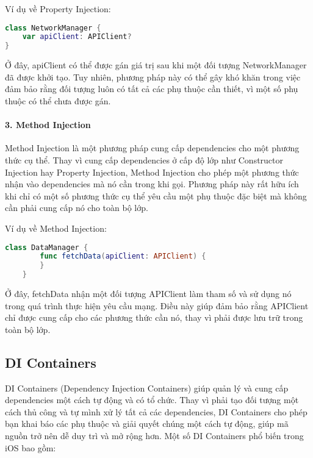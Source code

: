 Ví dụ về Property Injection:
\begin{lstlisting}[language=Swift]
  class NetworkManager {
    var apiClient: APIClient?
}
  \end{lstlisting}
  Ở đây, apiClient có thể được gán giá trị sau khi một đối tượng NetworkManager đã được khởi tạo. Tuy nhiên, phương pháp này có thể gây khó khăn trong việc đảm bảo rằng đối tượng luôn có tất cả các phụ thuộc cần thiết, vì một số phụ thuộc có thể chưa được gán.

\paragraph*{3. Method Injection}
  Method Injection là một phương pháp cung cấp dependencies cho một phương thức cụ thể. Thay vì cung cấp dependencies ở cấp độ lớp như Constructor Injection hay Property Injection, Method Injection cho phép một phương thức nhận vào dependencies mà nó cần trong khi gọi. Phương pháp này rất hữu ích khi chỉ có một số phương thức cụ thể yêu cầu một phụ thuộc đặc biệt mà không cần phải cung cấp nó cho toàn bộ lớp.

  Ví dụ về Method Injection:
  \begin{lstlisting}[language=Swift]
    class DataManager {
        func fetchData(apiClient: APIClient) {
        }
    }
    \end{lstlisting}
    Ở đây, fetchData nhận một đối tượng APIClient làm tham số và sử dụng nó trong quá trình thực hiện yêu cầu mạng. Điều này giúp đảm bảo rằng APIClient chỉ được cung cấp cho các phương thức cần nó, thay vì phải được lưu trữ trong toàn bộ lớp.
\subsection{DI Containers}
    DI Containers (Dependency Injection Containers) giúp quản lý và cung cấp dependencies một cách tự động và có tổ chức. Thay vì phải tạo đối tượng một cách thủ công và tự mình xử lý tất cả các dependencies, DI Containers cho phép bạn khai báo các phụ thuộc và giải quyết chúng một cách tự động, giúp mã nguồn trở nên dễ duy trì và mở rộng hơn. Một số DI Containers phổ biến trong iOS bao gồm:

